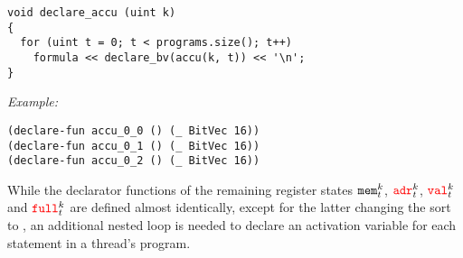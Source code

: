 \begin{lstlisting}[style=c++]
void declare_accu (uint k)
{
  for (uint t = 0; t < programs.size(); t++)
    formula << declare_bv(accu(k, t)) << '\n';
}
\end{lstlisting}

\noindent
\emph{Example:} 

% 
\begin{lstlisting}[style=smtlib]
(declare-fun accu_0_0 () (_ BitVec 16))
(declare-fun accu_0_1 () (_ BitVec 16))
(declare-fun accu_0_2 () (_ BitVec 16))
\end{lstlisting}

\noindent
While the declarator functions of the remaining register states
$\texttt{mem}^k_t$, ${\color{red}\texttt{adr}}^k_t$, ${\color{red}\texttt{val}}^k_t$ and ${\color{red}\texttt{full}}^k_t$
are defined almost identically, except for the latter
changing the sort to ,
an additional nested loop is needed to declare an activation variable for each statement in a thread's program.

